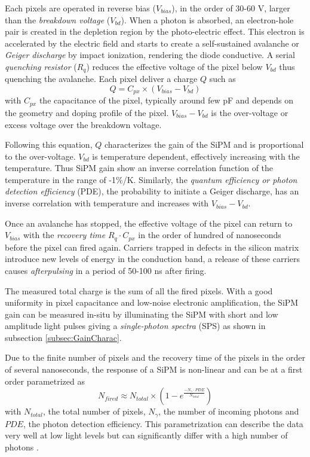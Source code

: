 Each pixels are operated in reverse bias ($V_{bias}$), in the order of 30-60 V, larger than the \textit{breakdown voltage} ($V_{bd}$). When a photon is absorbed, an electron-hole pair is created in the depletion region by the photo-electric effect. This electron is accelerated by the electric field and starts to create a self-sustained avalanche or \textit{Geiger discharge} by impact ionization, rendering the diode conductive. A serial \textit{quenching resistor} ($R_q$) reduces the effective voltage of the pixel below $V_{bd}$ thus quenching the avalanche. Each pixel deliver a charge $Q$ such as
\begin{equation}
  Q = C_{px} \times (V_{bias} - V_{bd})
\end{equation}
with $C_{px}$ the capacitance of the pixel, typically around few pF and depends on the geometry and doping profile of the pixel. $V_{bias} - V_{bd}$ is the over-voltage or excess voltage over the breakdown voltage.

Following this equation, $Q$ characterizes the gain of the SiPM and is proportional to the over-voltage. $V_{bd}$ is temperature dependent, effectively increasing with the temperature. Thus SiPM gain show an inverse correlation function of the temperature in the range of -1\%/K. Similarly, the \textit{quantum efficiency or photon detection efficiency} (PDE), the probability to initiate a Geiger discharge, has an inverse correlation with temperature and increases with $V_{bias} - V_{bd}$.

Once an avalanche has stopped, the effective voltage of the pixel can return to $V_{bias}$ with the \textit{recovery time} $R_q \cdot C_{px}$ in the order of hundred of nanoseconds before the pixel can fired again. Carriers trapped in defects in the silicon matrix introduce new levels of energy in the conduction band, a release of these carriers causes \textit{afterpulsing} in a period of 50-100 ns after firing.

The measured total charge is the sum of all the fired pixels. With a good uniformity in pixel capacitance and low-noise electronic amplification, the SiPM gain can be measured in-situ by illuminating the SiPM with short and low amplitude light pulses giving a \textit{single-photon spectra} (SPS) as shown in subsection \ref{subsec:GainCharac}.

Due to the finite number of pixels and the recovery time of the pixels in the order of several nanoseconds, the response of a SiPM is non-linear and can be at a first order parametrized as
\begin{equation}
  N_{fired} \approx N_{total} \times (1 - e^{\frac{- N_{\gamma} \cdot PDE}{N_{total}}})
\end{equation}
with $N_{total}$, the total number of pixels, $N_{\gamma}$, the number of incoming photons and $PDE$, the photon detection efficiency. This parametrization can describe the data very well at low light levels but can significantly differ with a high number of photons \cite{Kotera:2015rha}.

